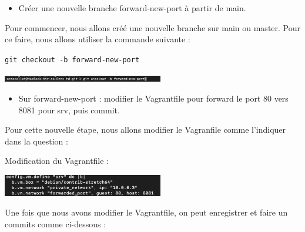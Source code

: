 \documentclass[12pt]{article}
\begin{document}
\vspace{0.3cm}

\begin{itemize}
  \item Créer une nouvelle branche forward-new-port à partir de main.
\end{itemize}

\vspace{0.3cm}

Pour commencer, nous allons créé une nouvelle branche sur main ou master. Pour ce faire, nous allons utiliser la commande suivante : 

\texttt{git checkout -b forward-new-port}

\vspace{0.3cm}

\begin{center}
  \includegraphics[width=7cm]{Image-TD-Git-4/git-checkout.png}
\end{center}

\vspace{0.3cm}

\begin{itemize}
  \item Sur forward-new-port : modifier le Vagrantfile pour forward le port 80 vers 8081 pour srv, puis commit.
\end{itemize}

\vspace{0.3cm}

Pour cette nouvelle étape, nous allons modifier le Vagranfile comme l'indiquer dans la question : 

\vspace{0.3cm}

Modification du Vagrantfile : 

\vspace{0.3cm}

\begin{center}
  \includegraphics[width=7cm]{Image-TD-Git-4/Forward-port.png}
\end{center}

\vspace{0.3cm}

Une fois que nous avons modifier le Vagrantfile, on peut enregistrer et faire un commits comme ci-dessous : 
\end{document}
